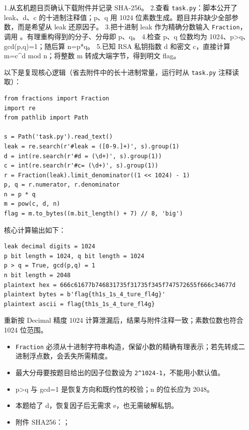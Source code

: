 1.从玄机题目页确认下载附件并记录 SHA-256。 2.查看 \texttt{task.py}：脚本公开了 leak、d、c 的十进制注释值；p、q 用 1024 位素数生成。题目并非缺少全部参数，而是希望从 leak 还原因子。 3.把十进制 leak 作为精确分数输入 \texttt{Fraction}，调用 \texttt{}。有理重构得到的分子、分母即 p、q。 4.检查 p、q 位数均为 1024、p\textgreater q、gcd(p,q)=1；随后算 n=p*q。 5.已知 RSA 私钥指数 d 和密文 c，直接计算 m=c\^{}d mod n；将整数 m 转成大端字节，得到明文 flag。

以下是复现核心逻辑（省去附件中的长十进制常量，运行时从 \texttt{task.py} 注释读取）：

\begin{verbatim}
from fractions import Fraction
import re
from pathlib import Path

s = Path('task.py').read_text()
leak = re.search(r'#leak = ([0-9.]+)', s).group(1)
d = int(re.search(r'#d = (\d+)', s).group(1))
c = int(re.search(r'#c= (\d+)', s).group(1))
r = Fraction(leak).limit_denominator((1 << 1024) - 1)
p, q = r.numerator, r.denominator
n = p * q
m = pow(c, d, n)
flag = m.to_bytes((m.bit_length() + 7) // 8, 'big')
\end{verbatim}

核心计算输出如下：

\begin{verbatim}
leak decimal digits = 1024
p bit length = 1024, q bit length = 1024
p > q = True, gcd(p,q) = 1
n bit length = 2048
plaintext hex = 666c61677b746831735f31735f345f747572655f666c34677d
plaintext bytes = b'flag{th1s_1s_4_ture_fl4g}'
plaintext ascii = flag{th1s_1s_4_ture_fl4g}
\end{verbatim}

重新按 Decimal 精度 1024 计算泄漏后，结果与附件注释一致；素数位数也符合 1024 位范围。

\begin{itemize}
\tightlist
\item
  \texttt{Fraction} 必须从十进制字符串构造，保留小数的精确有理表示；若先转成二进制浮点数，会丢失所需精度。
\item
  最大分母要按题目给出的因子位数设为 \texttt{2\^{}1024-1}，不能用小默认值。
\item
  p\textgreater q 与 gcd=1 是恢复方向和既约性的校验；n 的位长应为 2048。
\item
  本题给了 d，恢复因子后无需求 e，也无需破解私钥。
\item
  附件 SHA256：\texttt{}；
\end{itemize}

